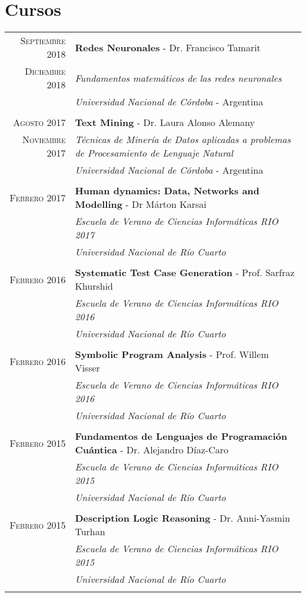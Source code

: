 \documentclass[a4paper,10pt]{article} %
\begin{document}
\section{Cursos}
\begin{longtable}{rl}
\\
\textsc{Septiembre} 2018 & \textbf{Redes Neuronales} - Dr. Francisco Tamarit \\
\textsc{Diciembre} 2018 & \textit{Fundamentos matemáticos de las redes neuronales}  \\ 
& \textit{Universidad Nacional de Córdoba} - Argentina \\ & \\

\textsc{Agosto} 2017 & \textbf{Text Mining} - Dr. Laura Alonso Alemany \\
\textsc{Noviembre} 2017 & \textit{Técnicas de Minería de Datos aplicadas a problemas de Procesamiento de Lenguaje Natural}  \\ 
& \textit{Universidad Nacional de Córdoba} - Argentina \\ & \\

\textsc{Febrero} 2017 & \textbf{Human dynamics: Data, Networks and Modelling} - Dr Márton Karsai \\
& \textit{Escuela de Verano de Ciencias Informáticas RIO 2017} \\
& \textit{Universidad Nacional de Río Cuarto} \\ & \\

\textsc{Febrero} 2016 & \textbf{Systematic Test Case Generation} - Prof. Sarfraz Khurshid \\
& \textit{Escuela de Verano de Ciencias Informáticas RIO 2016} \\
& \textit{Universidad Nacional de Río Cuarto} \\ & \\

\textsc{Febrero} 2016 & \textbf{Symbolic Program Analysis} - Prof. Willem Visser \\
& \textit{Escuela de Verano de Ciencias Informáticas RIO 2016} \\
& \textit{Universidad Nacional de Río Cuarto} \\ & \\

\textsc{Febrero} 2015 & \textbf{Fundamentos de Lenguajes de Programación Cuántica} - Dr. Alejandro Díaz-Caro \\
& \textit{Escuela de Verano de Ciencias Informáticas RIO 2015} \\
& \textit{Universidad Nacional de Río Cuarto} \\ & \\

\textsc{Febrero} 2015 & \textbf{Description Logic Reasoning} - Dr. Anni-Yasmin Turhan\\
& \textit{Escuela de Verano de Ciencias Informáticas RIO 2015} \\
& \textit{Universidad Nacional de Río Cuarto} \\ & \\

\end{longtable}
\end{document}
